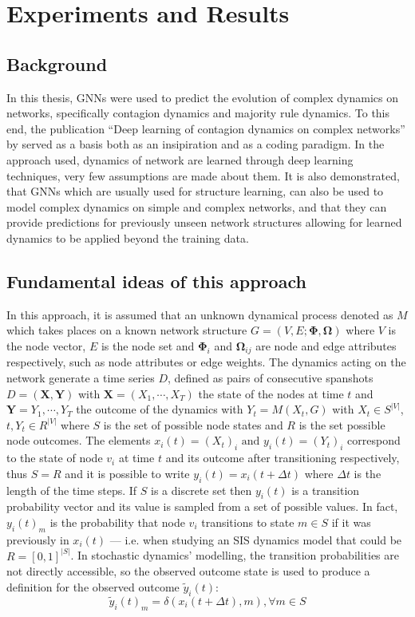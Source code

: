 \chapter{Experiments and Results} \label{experiments}

\section{Background}

In this thesis, GNNs were used to predict the evolution of
complex dynamics on networks, specifically contagion dynamics
and majority rule dynamics. To this end, the publication
``Deep learning of contagion dynamics on complex networks''
by \citet{murphy} served as a basis both as an insipiration
and as a coding paradigm. In the approach used, dynamics of network
are learned through deep learning techniques, very few assumptions
are made about them. It is also demonstrated, that GNNs which
are usually used for structure learning, can also be used to model
complex dynamics on simple and complex networks, and that they
can provide predictions for previously unseen network structures allowing
for learned dynamics to be applied beyond the training data. 


\section{Fundamental ideas of this approach}

In this approach, it is assumed that an unknown dynamical process
denoted as $M$ which takes places on a known network structure
$G = (V, E; \bm{\Phi}, \bm{\Omega})$ where $V$ is the node vector,
$E$ is the node set and $\bm{\Phi}_i$ and $\bm{\Omega}_{ij}$ are node
and edge attributes respectively, such as node attributes or edge weights. 
The dynamics acting on the network generate a time series $D$, defined as
pairs of consecutive spanshots $D = (\bm{X}, \bm{Y})$ with
$\bm{X} = (X_1, \cdots, X_T)$ the state of the nodes at time $t$ and
$\bm{Y} = {Y_1, \cdots, Y_T}$ the outcome of the dynamics with
$Y_t = M(X_t, G)$ with $X_t \in S^{|V|}$, $t, Y_t \in R^{|V|}$ where
$S$ is the set of possible node states and $R$ is the set possible node
outcomes. The elements $x_i(t) = (X_t)_i \text{ and } y_i(t) = (Y_t)_i$
correspond to the state of node $v_i$ at time $t$ and its outcome after
transitioning respectively, thus $S=R$ and it is possible to write
$y_i(t) = x_i(t + \Delta t)$ where $\Delta t$ is the length of the
time steps. If $S$ is a discrete set then $y_i(t)$ is a transition
probability vector and its value is sampled from a set of possible
values. In fact, $y_i(t)_m$ is the probability that node $v_i$ transitions
to state $m \in S$ if it was previously in $x_i(t)$ --- i.e. when studying
an SIS dynamics model that could be $R = [0,1]^{|S|}$. In stochastic dynamics'
modelling, the transition probabilities are not directly accessible, so
the observed outcome state is used to produce a definition for the observed
outcome $\tilde{y}_i(t)$:
\begin{equation}
  \tilde{y}_i(t)_m = \delta (x_i(t+\Delta t), m), \forall m \in S
\end{equation}

